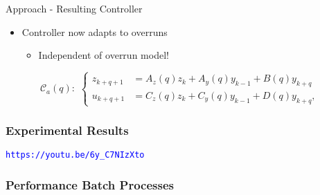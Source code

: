\begin{frame}{Approach - Resulting Controller}
    \begin{itemize}
        \item Controller now adapts to overruns
            \begin{itemize}
                \item Independent of overrun model!
            \end{itemize}
    \end{itemize}

    \begin{equation*}
        \mathcal{C}_a\left(q\right):
        \,\,
        \begin{cases}
            z_{k+q+1} &= A_z(q) z_{k} + A_y(q) y_{k-1} + B(q) y_{k+q} \\
            u_{k+q+1} &= C_z(q) z_{k} + C_y(q) y_{k-1} + D(q) y_{k+q},
        \end{cases}
    \end{equation*}
\end{frame}

\begin{frame}
    \frametitle{Experimental Results}
    \centering
    \textcolor{blue}{\texttt{https://youtu.be/6y\_C7NIzXto}}
\end{frame}

\begin{frame}
    \frametitle{Performance Batch Processes}
    \begin{figure}[h]
        \centering
        \resizebox{0.9\textwidth}{!}{}
    \end{figure}
\end{frame}
